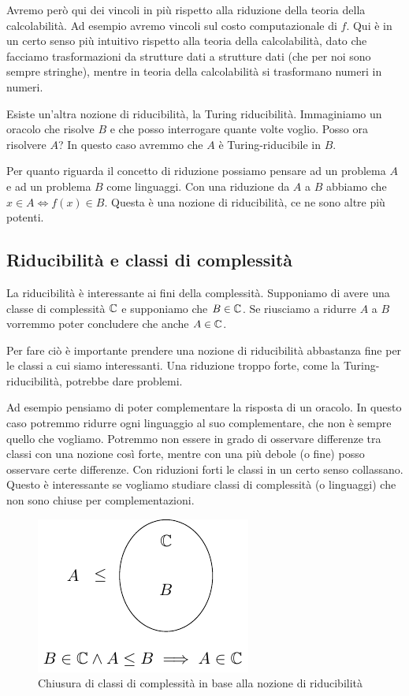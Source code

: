 Avremo però qui dei vincoli in più rispetto alla riduzione della teoria della calcolabilità. Ad
esempio avremo vincoli sul costo computazionale di $f$. Qui è in un certo senso più intuitivo
rispetto alla teoria della calcolabilità, dato che facciamo trasformazioni da strutture dati a
strutture dati (che per noi sono sempre stringhe), mentre in teoria della calcolabilità si
trasformano numeri in numeri.

Esiste un'altra nozione di riducibilità, la Turing riducibilità. Immaginiamo un oracolo che
risolve $B$ e che posso interrogare quante volte voglio. Posso ora risolvere $A$? In questo caso
avremmo che $A$ è Turing-riducibile in $B$.

Per quanto riguarda il concetto di riduzione possiamo pensare ad un problema $A$ e ad un problema
$B$ come linguaggi. Con una riduzione da $A$ a $B$ abbiamo che $x \in A \iff f(x) \in B$. Questa è una
nozione di riducibilità, ce ne sono altre più potenti.

\subsection{Riducibilità e classi di complessità}

La riducibilità è interessante ai fini della complessità. Supponiamo di avere una classe di
complessità $\mathbb{C}$ e supponiamo che $B \in \mathbb{C}$. Se riusciamo a ridurre $A$ a $B$ vorremmo
poter concludere che anche $A \in \mathbb{C}$.

Per fare ciò è importante prendere una nozione di riducibilità abbastanza fine per le classi a
cui siamo interessanti. Una riduzione troppo forte, come la Turing-riducibilità, potrebbe dare
problemi.

Ad esempio pensiamo di poter complementare la risposta di un oracolo. In questo caso potremmo
ridurre ogni linguaggio al suo complementare, che non è sempre quello che vogliamo. Potremmo non
essere in grado di osservare differenze tra classi con una nozione così forte, mentre con una più
debole (o fine) posso osservare certe differenze. Con riduzioni forti le classi in un certo senso
collassano. Questo è interessante se vogliamo studiare classi di complessità (o linguaggi) che non
sono chiuse per complementazioni.

\begin{figure}[h]
    \begin{center}
        \includegraphics{img/ReducibilityNotion.pdf}
    \end{center}
    \caption{Chiusura di classi di complessità in base alla nozione di riducibilità}
    \label{ReducibilityNotion}
\end{figure}

